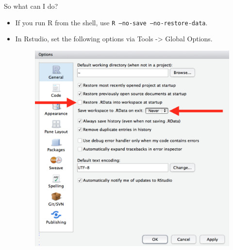 \documentclass[
hyperref={bookmarks=false},
xcolor={dvipsnames,svgnames*,x11names*}, 
12pt
]{beamer}
\begin{document}
\begin{frame}{So what can I do?}
\vspace{-0.5cm}
\begin{itemize}
\itemsep 2ex
\item If you run R from the shell, use \texttt{R --no-save --no-restore-data}.
\item In Rstudio, set the following options via Tools -> Global Options.  
\vspace{1.5ex}
\begin{figure}
\centering
\includegraphics[width=0.9\linewidth, trim=0 13.25cm 0 0, clip]{figures/rstudio-workspace.png}
\end{figure}
\end{itemize}
\end{frame}
\end{document}
